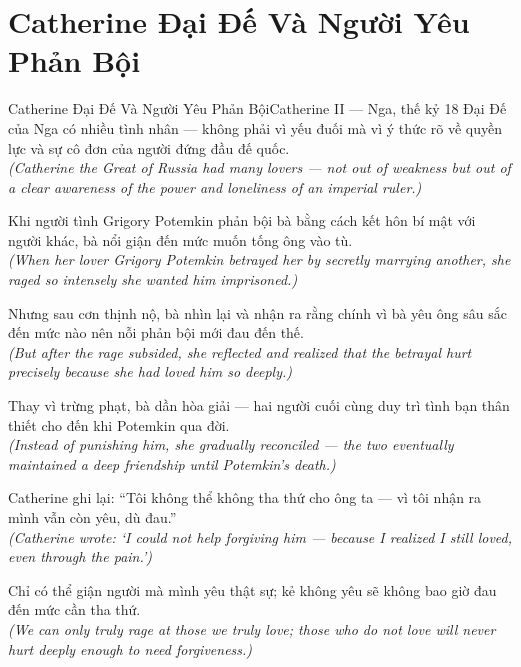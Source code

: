 \section{Catherine Đại Đế Và Người Yêu Phản Bội}
\begin{truyen}{Catherine Đại Đế Và Người Yêu Phản Bội}{Catherine II --- Nga, thế kỷ 18}
 Đại Đế của Nga có nhiều tình nhân --- không phải vì yếu đuối mà vì ý thức rõ về quyền lực và sự cô đơn của người đứng đầu đế quốc.\\[4pt]
\textit{(Catherine the Great of Russia had many lovers --- not out of weakness but out of a clear awareness of the power and loneliness of an imperial ruler.)}

Khi người tình Grigory Potemkin phản bội bà bằng cách kết hôn bí mật với người khác, bà nổi giận đến mức muốn tống ông vào tù.\\[4pt]
\textit{(When her lover Grigory Potemkin betrayed her by secretly marrying another, she raged so intensely she wanted him imprisoned.)}

Nhưng sau cơn thịnh nộ, bà nhìn lại và nhận ra rằng chính vì bà yêu ông sâu sắc đến mức nào nên nỗi phản bội mới đau đến thế.\\[4pt]
\textit{(But after the rage subsided, she reflected and realized that the betrayal hurt precisely because she had loved him so deeply.)}

Thay vì trừng phạt, bà dần hòa giải --- hai người cuối cùng duy trì tình bạn thân thiết cho đến khi Potemkin qua đời.\\[4pt]
\textit{(Instead of punishing him, she gradually reconciled --- the two eventually maintained a deep friendship until Potemkin's death.)}

Catherine ghi lại: ``Tôi không thể không tha thứ cho ông ta --- vì tôi nhận ra mình vẫn còn yêu, dù đau.''\\[4pt]
\textit{(Catherine wrote: `I could not help forgiving him --- because I realized I still loved, even through the pain.')}

\end{truyen}
\begin{baihoc}
  Chỉ có thể giận người mà mình yêu thật sự; kẻ không yêu sẽ không bao giờ đau đến mức cần tha thứ.\\[4pt]
  \textit{(We can only truly rage at those we truly love; those who do not love will never hurt deeply enough to need forgiveness.)}
\end{baihoc}

